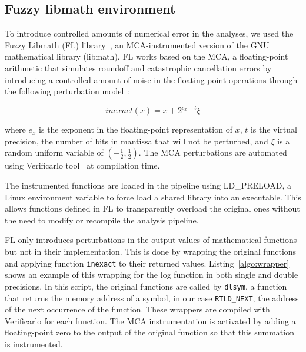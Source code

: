 \documentclass[conference]{IEEEtran}
\begin{document}
\subsection{Fuzzy libmath environment}

To introduce controlled amounts of numerical error in the analyses, we used the Fuzzy Libmath (FL) library~\cite{salari2021accurate}, an MCA-instrumented 
version of the GNU mathematical library (libmath).
FL works based on the MCA, a floating-point arithmetic that simulates roundoff and catastrophic cancellation errors
by introducing a controlled amount of noise in the floating-point operations 
through the following perturbation model~\cite{Parker1997-qq}:

\begin{equation} \label{eq:mca_inexact}
  inexact(x) = x + 2^{e_x-t}\xi
\end{equation}

where $e_x$ is the exponent in the floating-point representation of $x$,
$t$ is the virtual precision, the number of bits in mantissa that will not be perturbed,
and $\xi$ is a random uniform variable of $(-\frac{1}{2}, \frac{1}{2})$.
The MCA perturbations are automated using Verificarlo tool~\cite{denis2015verificarlo} at compilation time.

The instrumented functions are loaded in the pipeline using LD\_PRELOAD, a Linux environment variable
to force load a shared library into an executable. This allows functions defined in FL to transparently
overload the original ones without the need to modify or recompile the analysis pipeline.

FL only introduces perturbations in the output values of mathematical
functions but not in their implementation. This is done by wrapping the original functions 
and applying function \texttt{inexact} to their returned values.
Listing~\ref{algo:wrapper} shows an example of this wrapping for the log function in both single and double precisions.
In this script, the original functions are called by \texttt{dlsym},
a function that returns the memory address of a symbol, in our case \texttt{RTLD\_NEXT}, the address of the next occurrence of the function.
These wrappers are compiled with Verificarlo for each function. The MCA
instrumentation is activated by adding a floating-point zero to the output
of the original function so that this summation is instrumented.


\end{document}
